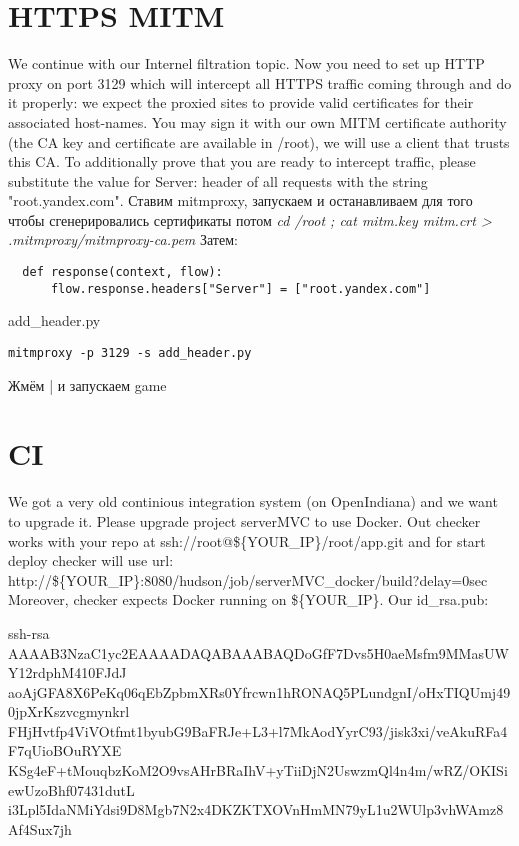 \documentclass[a4paper,10pt]{report}
\begin{document}
\chapter{HTTPS MITM}
We continue with our Internel filtration topic. Now you need to set up HTTP proxy on port 3129 which will intercept all HTTPS traffic coming through and do it properly: we expect the proxied sites to provide valid certificates for their associated host-names. You may sign it with our own MITM certificate authority (the CA key and certificate are available in /root), we will use a client that trusts this CA.
\newline
To additionally prove that you are ready to intercept traffic, please substitute the value for Server: header of all requests with the string "root.yandex.com".
\newline\newline
Ставим mitmproxy, запускаем и останавливаем для того чтобы сгенерировались сертификаты
\newline
потом \textit{cd /root ; cat mitm.key mitm.crt > .mitmproxy/mitmproxy-ca.pem}
\newline
Затем:
\newline
\begin{listing}[H]
  \begin{verbatim}
  def response(context, flow):
      flow.response.headers["Server"] = ["root.yandex.com"]
  \end{verbatim}
  \caption{add\_header.py}
  \label{lst:add_header.py}
\end{listing}
\begin{verbatim}
mitmproxy -p 3129 -s add_header.py
\end{verbatim}
Жмём | и запускаем game

\chapter{CI}
We got a very old continious integration system (on OpenIndiana) and we want to upgrade it.
\newline
Please upgrade project serverMVC to use Docker.
\newline
Out checker works with your repo at ssh://root@\$\{YOUR\_IP\}/root/app.git and for start deploy checker will use url: http://\$\{YOUR\_IP\}:8080/hudson/job/serverMVC\_docker/build?delay=0sec
\newline
Moreover, checker expects Docker running on \$\{YOUR\_IP\}.
\newline
Our id\_rsa.pub:
\begin{tiny}
ssh-rsa AAAAB3NzaC1yc2EAAAADAQABAAABAQDoGfF7Dvs5H0aeMsfm9MMasUWY12rdphM410FJdJ
aoAjGFA8X6PeKq06qEbZpbmXRs0Yfrcwn1hRONAQ5PLundgnI/oHxTIQUmj490jpXrKszvcgmynkrl
FHjHvtfp4ViVOtfmt1byubG9BaFRJe+L3+l7MkAodYyrC93/jisk3xi/veAkuRFa4F7qUioBOuRYXE
KSg4eF+tMouqbzKoM2O9vsAHrBRaIhV+yTiiDjN2UswzmQl4n4m/wRZ/OKISiewUzoBhf07431dutL
i3Lpl5IdaNMiYdsi9D8Mgb7N2x4DKZKTXOVnHmMN79yL1u2WUlp3vhWAmz8Af4Sux7jh
\end{tiny}
\newline\newline
\end{document}
